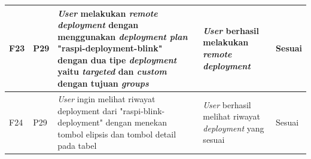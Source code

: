 \begin{table}[ht]
\begin{tabular}{|p{2cm}|p{2cm}|p{4cm}|p{3cm}|p{2cm}|}
    \hline
    F23                       & P29                                                 & \textit{User} melakukan \textit{remote deployment} dengan menggunakan \textit{deployment plan} "raspi-deployment-blink" dengan dua tipe \textit{deployment} yaitu \textit{targeted} dan \textit{custom} dengan tujuan \textit{groups} & \textit{User} berhasil melakukan \textit{remote deployment}            & Sesuai  \\
    \hline
    F24                       & P29                                                 & \textit{User} ingin melihat riwayat deployment dari "raspi-blink-deployment"                                                               dengan menekan tombol elipsis dan tombol detail pada tabel                                 & \textit{User} berhasil melihat riwayat \textit{deployment} yang sesuai & Sesuai  \\
    \hline
  \end{tabular}
\end{table}
\egroup